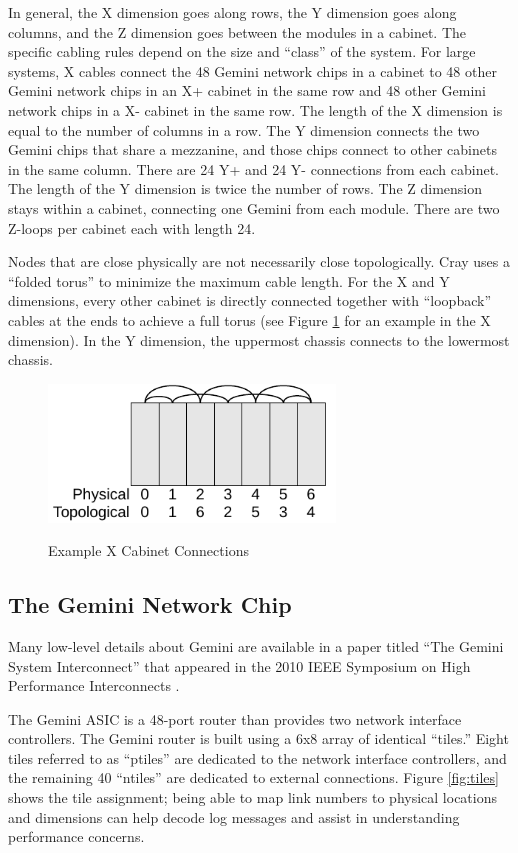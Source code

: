 \documentclass[10pt, conference, compsocconf]{IEEEtran}
\begin{document}
In general, the X dimension goes along rows, the Y dimension goes along
columns, and the Z dimension goes between the modules in a cabinet.  The
specific cabling rules depend on the size and ``class'' of the system.  For
large systems, X cables connect the 48 Gemini network chips in a cabinet to 48
other Gemini network chips in an X+ cabinet in the same row and 48 other Gemini
network chips in a X- cabinet in the same row.  The length of the X dimension
is equal to the number of columns in a row.  The Y dimension connects the two
Gemini chips that share a mezzanine, and those chips connect to other cabinets
in the same column.  There are 24 Y+ and 24 Y- connections from each cabinet.
The length of the Y dimension is twice the number of rows.  The Z dimension
stays within a cabinet, connecting one Gemini from each module.  There are two
Z-loops per cabinet each with length 24.

Nodes that are close physically are not necessarily close topologically.  Cray
uses a ``folded torus'' to minimize the maximum cable length.  For the X and Y
dimensions, every other cabinet is directly connected together with
``loopback'' cables at the ends to achieve a full torus (see Figure
\ref{fig:cabfold} for an example in the X dimension).  In the Y dimension, the
uppermost chassis connects to the lowermost chassis.

\begin{figure}
  \centering
  \includegraphics[width=3.0in]{figures/cabinets_folded.pdf}\\
  \caption{Example X Cabinet Connections}\label{fig:cabfold}
\end{figure}

\subsection{The Gemini Network Chip}

Many low-level details about Gemini are available in a paper titled ``The
Gemini System Interconnect'' that appeared in the 2010 IEEE Symposium on High
Performance Interconnects \cite{hoti}.

The Gemini ASIC is a 48-port router than provides two network interface
controllers.  The Gemini router is built using a 6x8 array of identical
``tiles.''  Eight tiles referred to as ``ptiles'' are dedicated to the network
interface controllers, and the remaining 40 ``ntiles'' are dedicated to
external connections.  Figure \ref{fig:tiles} shows the tile assignment; being
able to map link numbers to physical locations and dimensions can help decode
log messages and assist in understanding performance concerns.
\end{document}
